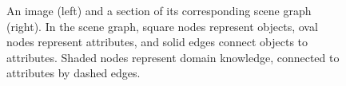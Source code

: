\begin{figure}[t]
\begin{subfigure}[t]{0.45\textwidth}
        \label{fig:sg}
    \end{subfigure}
    \caption{An image (left) and a section of its corresponding scene graph (right). In the scene graph, square nodes represent objects, oval nodes represent attributes, and solid edges connect objects to attributes. Shaded nodes represent domain knowledge, connected to attributes by dashed edges.}
    \label{fig:sgaug}
\end{figure}







